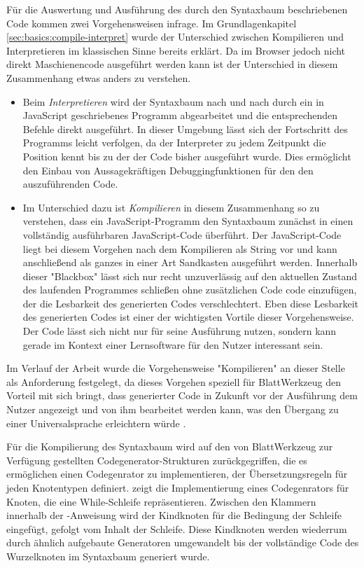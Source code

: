 Für die Auswertung und Ausführung des durch den Syntaxbaum beschriebenen Code kommen zwei Vorgehensweisen infrage. Im Grundlagenkapitel \ref{sec:basics:compile-interpret} wurde der Unterschied zwischen Kompilieren und Interpretieren im klassischen Sinne bereits erklärt. Da im Browser jedoch nicht direkt Maschienencode ausgeführt werden kann ist der Unterschied in diesem Zusammenhang etwas anders zu verstehen.

\begin{itemize}
  \item Beim \emph{Interpretieren} wird der Syntaxbaum nach und nach durch ein in JavaScript geschriebenes Programm abgearbeitet und die entsprechenden Befehle direkt ausgeführt. In dieser Umgebung lässt sich der Fortschritt des Programms leicht verfolgen, da der Interpreter zu jedem Zeitpunkt die Position kennt bis zu der der Code bisher ausgeführt wurde. Dies ermöglicht den Einbau von Aussagekräftigen Debuggingfunktionen für den den auszuführenden Code.
  \item Im Unterschied dazu ist \emph{Kompilieren} in diesem Zusammenhang so zu verstehen, dass ein JavaScript-Programm den Syntaxbaum zunächst in einen vollständig ausführbaren JavaScript-Code überführt. Der JavaScript-Code liegt bei diesem Vorgehen nach dem Kompilieren als String vor und kann anschließend als ganzes in einer Art Sandkasten ausgeführt werden. Innerhalb dieser "Blackbox" lässt sich nur recht unzuverlässig auf den aktuellen Zustand des laufenden Programmes schließen ohne zusätzlichen Code code einzufügen, der die Lesbarkeit des generierten Codes verschlechtert. Eben diese Lesbarkeit des generierten Codes ist einer der wichtigsten Vortile dieser Vorgehensweise. Der Code lässt sich nicht nur für seine Ausführung nutzen, sondern kann gerade im Kontext einer Lernsoftware für den Nutzer interessant sein.
\end{itemize}

Im Verlauf der Arbeit wurde die Vorgehensweise "Kompilieren" an dieser Stelle als Anforderung festgelegt, da dieses Vorgehen speziell für BlattWerkzeug den Vorteil mit sich bringt, dass generierter Code in Zukunft vor der Ausführung dem Nutzer angezeigt und von ihm bearbeitet werden kann, was den Übergang zu einer Universalsprache erleichtern würde .

Für die Kompilierung des Syntaxbaum wird auf den von BlattWerkzeug zur Verfügung gestellten Codegenerator-Strukturen zurückgegriffen, die es ermöglichen einen Codegenrator zu implementieren, der Übersetzungsregeln für jeden Knotentypen definiert.  zeigt die Implementierung eines Codegenrators für Knoten, die eine While-Schleife repräsentieren. Zwischen den Klammern innerhalb der -Anweisung wird der Kindknoten für die Bedingung der Schleife eingefügt, gefolgt vom Inhalt der Schleife. Diese Kindknoten werden wiederrum durch ähnlich aufgebaute Generatoren umgewandelt bis der vollständige Code des Wurzelknoten im Syntaxbaum generiert wurde.

